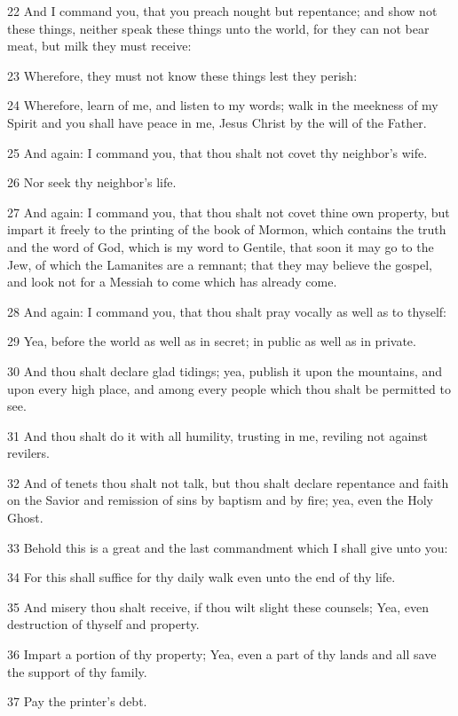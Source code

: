 				22 And I command you, that you preach nought but repentance; and show not these things, neither speak these things unto the world, for they can not bear meat, but milk they must receive:

				23 Wherefore, they must not know these things lest they perish:

				24 Wherefore, learn of me, and listen to my words; walk in the meekness of my Spirit and you shall have peace in me, Jesus Christ by the will of the Father.

				25 And again: I command you, that thou shalt not covet thy neighbor's wife.

				26 Nor seek thy neighbor's life.

				27 And again: I command you, that thou shalt not covet thine own property, but impart it freely to the printing of the book of Mormon, which contains the truth and the word of God, which is my word to Gentile, that soon it may go to the Jew, of which the Lamanites are a remnant; that they may believe the gospel, and look not for a Messiah to come which has already come.

				28 And again: I command you, that thou shalt pray vocally as well as to thyself:

				29 Yea, before the world as well as in secret; in public as well as in private.

				30 And thou shalt declare glad tidings; yea, publish it upon the mountains, and upon every high place, and among every people which thou shalt be permitted to see.

				31 And thou shalt do it with all humility, trusting in me, reviling not against revilers.

				32 And of tenets thou shalt not talk, but thou shalt declare repentance and faith on the Savior and remission of sins by baptism and by fire; yea, even the Holy Ghost.

				33 Behold this is a great and the last commandment which I shall give unto you:

				34 For this shall suffice for thy daily walk even unto the end of thy life.

				35 And misery thou shalt receive, if thou wilt slight these counsels; Yea, even destruction of thyself and property.

				36 Impart a portion of thy property; Yea, even a part of thy lands and all save the support of thy family.

				37 Pay the printer's debt.

